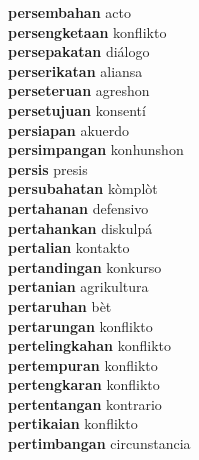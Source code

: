\textbf{persembahan } acto \\
\textbf{persengketaan } konflikto \\
\textbf{persepakatan } diálogo \\
\textbf{perserikatan } aliansa \\
\textbf{perseteruan } agreshon \\
\textbf{persetujuan } konsentí \\
\textbf{persiapan } akuerdo \\
\textbf{persimpangan } konhunshon \\
\textbf{persis } presis \\
\textbf{persubahatan } kòmplòt \\
\textbf{pertahanan } defensivo \\
\textbf{pertahankan } diskulpá \\
\textbf{pertalian } kontakto \\
\textbf{pertandingan } konkurso \\
\textbf{pertanian } agrikultura \\
\textbf{pertaruhan } bèt \\
\textbf{pertarungan } konflikto \\
\textbf{pertelingkahan } konflikto \\
\textbf{pertempuran } konflikto \\
\textbf{pertengkaran } konflikto \\
\textbf{pertentangan } kontrario \\
\textbf{pertikaian } konflikto \\
\textbf{pertimbangan } circunstancia \\
